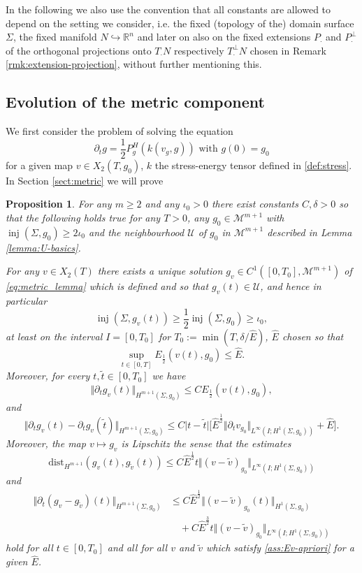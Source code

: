 \documentclass[10pt,reqno]{amsart}
\theoremstyle{plain}
\newtheorem{prop}[lemma]{Proposition}
\theoremstyle{definition}
\numberwithin{equation}{section}
\newcommand{\Si}{\Sigma}
\newcommand{\R}{\ensuremath{{\mathbb R}}}
\DeclareMathOperator{\inj}{inj}
\newcommand{\norm}[1]{\Vert#1\Vert}
\newcommand{\beq}{\begin{equation}}
\newcommand{\eeq}{\end{equation}}
\newcommand{\beqa}{\begin{equation}\begin{aligned}}
\newcommand{\eeqa}{\end{aligned}\end{equation}}
\newcommand{\half}{\frac{1}{2}}
\newcommand{\pt}{\partial_t}
\newcommand{\abs}[1]{\vert#1\vert}
\newcommand{\dist}{\text{dist}}
\newcommand{\Eh}{E_{\half}} %
\newcommand{\MM}{\mathcal{M}} %
\newcommand{\UU}{{\mathcal U}}
\newcommand{\Eupp}{\hat E}
\begin{document}
In the following we also use the convention that all constants are allowed to depend on the setting we consider, i.e. the fixed (topology of the) domain surface $\Si$, the fixed manifold $N\hookrightarrow \R^n$ and later on also on the fixed extensions $P_\cdot$ and $P_\cdot^\perp$ of the orthogonal projections onto $T_\cdot N$ respectively $T_\cdot ^\perp N$  chosen in Remark \ref{rmk:extension-projection}, without further mentioning this. 
\subsection{Evolution of the metric component}
We first consider the problem of solving the equation 
\beq\label{eq:metric_lemma}
    \partial_t g=\half P^H_g(k(v_g,g)) \text{ with } g(0)=g_0
\eeq
for a given map $v\in X_2(T,g_0)$, $k$ the stress-energy tensor defined in \eqref{def:stress}. In Section \ref{sect:metric} we will prove

\begin{prop}\label{prop:step1}
    For any $m\ge 2$ and any $\iota_0>0$ there exist constants $C,\delta>0$ so that  the following holds true for any $T>0$, any $g_0\in \MM^{m+1}$ with $\inj(\Si,g_0)\geq 2\iota_0$ and the neighbourhood $\UU$ of $g_0$ in $\MM^{m+1}$ described in Lemma \ref{lemma:U-basics}. 

    For any $v\in X_2(T)$ there exists a unique solution $g_v\in C^{1}([0,T_0],\MM^{m+1})$ of \eqref{eq:metric_lemma} which is defined and so that $g_v(t)\in\UU$, and hence in particular 
    \beq\label{est:inj-below}
        \inj(\Si,g_v(t))\geq \half \inj(\Si,g_0)\geq \iota_0,
    \eeq
    at least on the interval $I=[0,T_0]$ for $T_0:=\min(T,\delta/\Eupp)$, $\Eupp$ chosen so that  
    \beq\label{ass:Ev-apriori} 
        \sup_{t\in [0,T]}E_{\half}(v(t),g_0)\leq \Eupp.
    \eeq
    Moreover, for every $t,\tilde t\in [0,T_0]$ we have
    \beq\label{est:ptg_apriori_1}
        \norm{\pt g_v(t)}_{H^{m+1}(\Si,g_0)}\leq C \Eh(v(t),g_0),
    \eeq
    and 
    \beq\label{est:ptg_apriori_2}
        \norm{\pt g_v(t)-\pt g_v(\tilde t)}_{H^{m+1}(\Si,g_0)}\leq C\abs{t-\tilde t}\big[ \Eupp^\half \norm{\pt v_{g_0}}_{L^\infty(I;H^1(\Si,g_0))}+\Eupp \big].
    \eeq
    Moreover, the map $v\mapsto g_v$ is Lipschitz the sense that the estimates 
    \beq\label{est:g_diff_apriori}
        \dist_{H^{m+1}}(g_v(t),g_{\tilde v}(t))\leq C \Eupp^\half t \norm{(v-\tilde v)_{g_0}}_{L^\infty(I;H^1(\Si,g_0))}
    \eeq
    and 
    \beqa\label{est:ptg_diff_apriori}
        \norm{\pt (g_v-g_{\tilde v})(t)}_{H^{m+1}(\Si,g_0)}&\leq C \Eupp^\half \norm{(v-\tilde v)_{g_0}(t)}_{H^1(\Si,g_0)}\\
        &\quad+ C\Eupp^\frac{3}{2} t \norm{(v-\tilde v)_{g_0}}_{L^\infty(I;H^1( \Si,g_0))}
    \eeqa 
    hold for all $t\in [0,T_0]$ and all for all $v$ and $\tilde v$ which satisfy \eqref{ass:Ev-apriori} for a given $\Eupp$.
\end{prop} 
\end{document}
